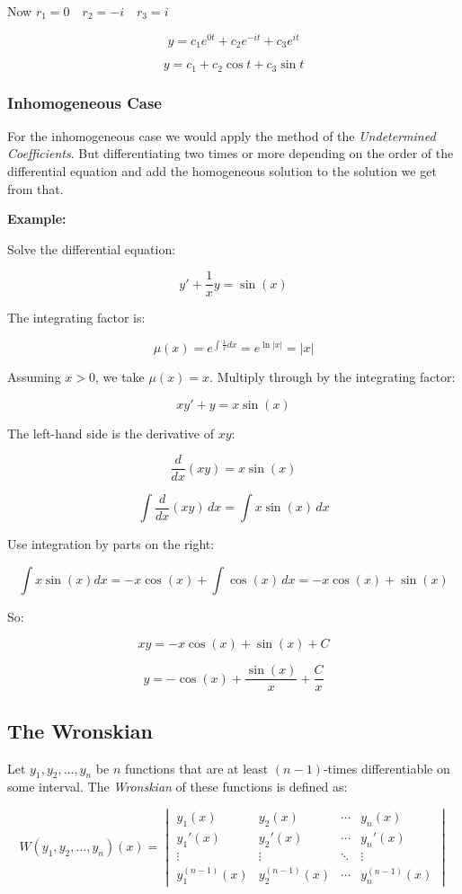 Now \(r_1 = 0 \quad r_2 = -i \quad r_3 = i\)

\[
    y = c_1 e^{0t} + c_2 e^{-it} + c_3 e^{it}
\]

\[
    y = c_1 + c_2 \cos t + c_3 \sin t
\]

\subsubsection{Inhomogeneous Case}

For the inhomogeneous case we would apply the method of the \emph{Undetermined Coefficients}. But 
differentiating two times or more depending on the order of the differential equation and add the 
homogeneous solution to the solution we get from that.

\textbf{Example:}

Solve the differential equation:

\[
    y' + \frac{1}{x} y = \sin(x)
\]

The integrating factor is:

\[
    \mu(x) = e^{\int \frac{1}{x} dx} = e^{\ln|x|} = |x|
\]

Assuming \( x > 0 \), we take \( \mu(x) = x \). Multiply through by the integrating factor:

\[
    x y' + y = x \sin(x)
\]

The left-hand side is the derivative of \( x y \):

\[
    \frac{d}{dx}(x y) = x \sin(x)
\]

\[
    \int \frac{d}{dx}(x y) \, dx = \int x \sin(x)\, dx
\]

Use integration by parts on the right:

\[
    \int x \sin(x) dx = -x \cos(x) + \int \cos(x) \, dx = -x \cos(x) + \sin(x)
\]

So:

\[
    x y = -x \cos(x) + \sin(x) + C
\]

\[
    y = -\cos(x) + \frac{\sin(x)}{x} + \frac{C}{x}
\]

\subsection{The Wronskian}

Let \( y_1, y_2, \ldots, y_n \) be \(n\) functions that are at least 
\( (n-1) \)-times differentiable on some interval. The \emph{Wronskian} of these 
functions is defined as:

\[
    W(y_1, y_2, \ldots, y_n)(x) =
    \begin{vmatrix}
    y_1(x) & y_2(x) & \cdots & y_n(x) \\
    y_1'(x) & y_2'(x) & \cdots & y_n'(x) \\
    \vdots & \vdots & \ddots & \vdots \\
    y_1^{(n-1)}(x) & y_2^{(n-1)}(x) & \cdots & y_n^{(n-1)}(x)
    \end{vmatrix}
\]

